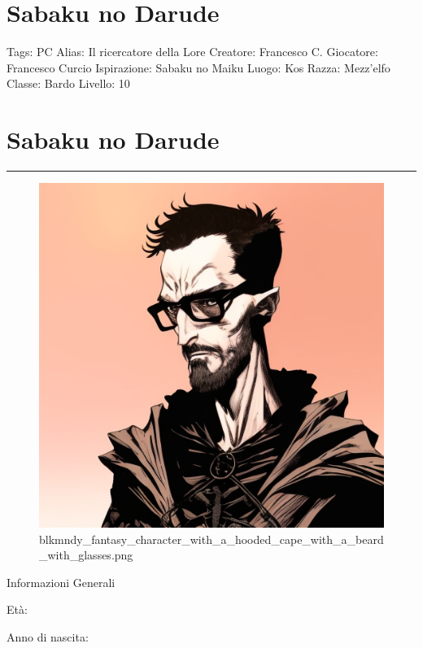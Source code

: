 \section{Sabaku no Darude}\label{sabaku-no-darude}

Tags: PC Alias: Il ricercatore della Lore Creatore: Francesco C.
Giocatore: Francesco Curcio Ispirazione: Sabaku no Maiku Luogo: Kos
Razza: Mezz'elfo Classe: Bardo Livello: 10

\section{Sabaku no Darude}\label{sabaku-no-darude-1}

\begin{center}\rule{0.5\linewidth}{0.5pt}\end{center}

\begin{figure}
\centering
\includegraphics{blkmndy_fantasy_character_with_a_hooded_cape_with_a_beard_with_glasses.png}
\caption{blkmndy\_fantasy\_character\_with\_a\_hooded\_cape\_with\_a\_beard\_with\_glasses.png}
\end{figure}

Informazioni Generali

Età:

Anno di nascita:

